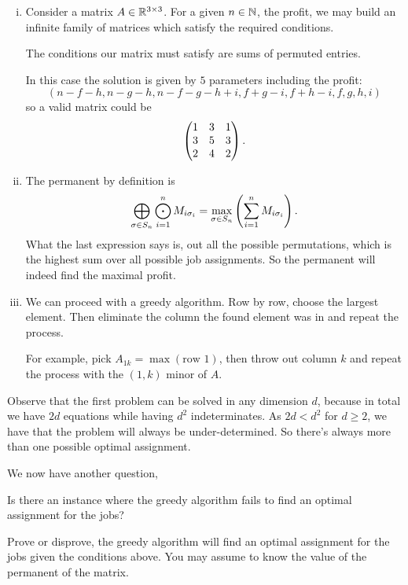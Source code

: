 \documentclass[12pt]{memoir}
\begin{document}
\begin{ptcb}
    \begin{enumerate}[i)]
        \itemsep=-0.4em
        \item Consider a matrix $A\in \mathbb{R}^{3\times3}$. For a given $n\in\mathbb{N}$, the profit, we may build an infinite family of matrices which satisfy the required conditions.\par 
        The conditions our matrix must satisfy are sums of permuted entries.\par 
        In this case the solution is given by $5$ parameters including the profit:
        $$(n-f-h,n-g-h,n-f-g-h+i,f+g-i,f+h-i,f,g,h,i)$$
        so a valid matrix could be 
        $$\begin{pmatrix} 1 & 3 & 1 \\ 3 & 5 & 3 \\ 2 & 4 & 2 \end{pmatrix}.$$
        \item The permanent by definition is 
        $$\bigoplus_{\sigma\in S_n}\bigodot_{i=1}^n M_{i\sigma_i}=\max_{\sigma\in S_n}\left(\sum_{i=1}^n M_{i\sigma_i}\right).$$
        What the last expression says is, out all the possible permutations, which is the highest sum over all possible job assignments. So the permanent will indeed find the maximal profit.
        \item We can proceed with a greedy algorithm. Row by row, choose the largest element. Then eliminate the column the found element was in and repeat the process.\par 
        For example, pick $A_{1k}=\max(\text{row }1)$, then throw out column $k$ and repeat the process with the $(1,k)$ minor of $A$. 
    \end{enumerate}
\end{ptcb}

\begin{Rmk}
Observe that the first problem can be solved in any dimension $d$, because in total we have $2d$ equations while having $d^2$ indeterminates. As $2d<d^2$ for $d\geq 2$, we have that the problem will always be under-determined. So there's always more than one possible optimal assignment. 
\end{Rmk}

We now have another question, 
\begin{significant}
    Is there an instance where the greedy algorithm fails to find an optimal assignment for the jobs?
\end{significant}

\begin{Ej}[5]
Prove or disprove, the greedy algorithm will find an optimal assignment for the jobs given the conditions above. You may assume to know the value of the permanent of the matrix.
\end{Ej}
\end{document}
